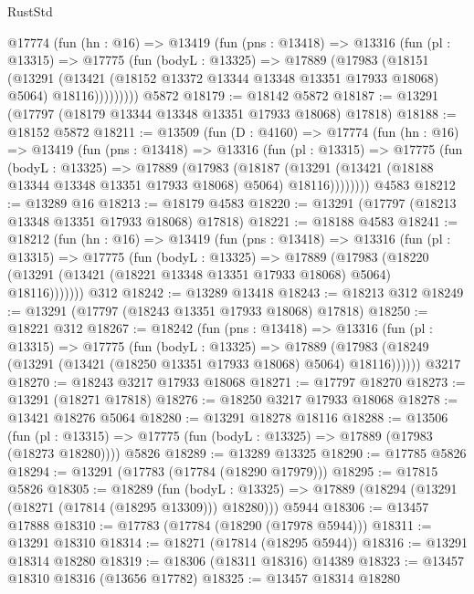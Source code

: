 \begin{lexlean}{RustStd}
\begin{coremodule}
      @17774
        (fun (hn : @16) =>
        @13419
          (fun (pns : @13418) =>
          @13316
            (fun (pl : @13315) =>
            @17775
              (fun (bodyL : @13325) =>
              @17889
                (@17983
                  (@18151
                    (@13291
                      (@13421 (@18152 @13372 @13344 @13348 @13351 @17933 @18068) @5064)
                      @18116)))))))))
    @5872
@18179 := @18142 @5872
@18187 := @13291 (@17797 (@18179 @13344 @13348 @13351 @17933 @18068) @17818)
@18188 := @18152 @5872
@18211 := @13509
    (fun (D : @4160) =>
    @17774
      (fun (hn : @16) =>
      @13419
        (fun (pns : @13418) =>
        @13316
          (fun (pl : @13315) =>
          @17775
            (fun (bodyL : @13325) =>
            @17889
              (@17983
                (@18187
                  (@13291 (@13421 (@18188 @13344 @13348 @13351 @17933 @18068) @5064) @18116))))))))
    @4583
@18212 := @13289 @16
@18213 := @18179 @4583
@18220 := @13291 (@17797 (@18213 @13348 @13351 @17933 @18068) @17818)
@18221 := @18188 @4583
@18241 := @18212
    (fun (hn : @16) =>
    @13419
      (fun (pns : @13418) =>
      @13316
        (fun (pl : @13315) =>
        @17775
          (fun (bodyL : @13325) =>
          @17889
            (@17983
              (@18220 (@13291 (@13421 (@18221 @13348 @13351 @17933 @18068) @5064) @18116)))))))
    @312
@18242 := @13289 @13418
@18243 := @18213 @312
@18249 := @13291 (@17797 (@18243 @13351 @17933 @18068) @17818)
@18250 := @18221 @312
@18267 := @18242
    (fun (pns : @13418) =>
    @13316
      (fun (pl : @13315) =>
      @17775
        (fun (bodyL : @13325) =>
        @17889 (@17983 (@18249 (@13291 (@13421 (@18250 @13351 @17933 @18068) @5064) @18116))))))
    @3217
@18270 := @18243 @3217 @17933 @18068
@18271 := @17797 @18270
@18273 := @13291 (@18271 @17818)
@18276 := @18250 @3217 @17933 @18068
@18278 := @13421 @18276 @5064
@18280 := @13291 @18278 @18116
@18288 := @13506
    (fun (pl : @13315) => @17775 (fun (bodyL : @13325) => @17889 (@17983 (@18273 @18280))))
    @5826
@18289 := @13289 @13325
@18290 := @17785 @5826
@18294 := @13291 (@17783 (@17784 (@18290 @17979)))
@18295 := @17815 @5826
@18305 := @18289
    (fun (bodyL : @13325) => @17889 (@18294 (@13291 (@18271 (@17814 (@18295 @13309))) @18280)))
    @5944
@18306 := @13457 @17888
@18310 := @17783 (@17784 (@18290 (@17978 @5944)))
@18311 := @13291 @18310
@18314 := @18271 (@17814 (@18295 @5944))
@18316 := @13291 @18314 @18280
@18319 := @18306 (@18311 @18316) @14389
@18323 := @13457 @18310 @18316 (@13656 @17782)
@18325 := @13457 @18314 @18280

\end{coremodule}
\end{lexlean}
